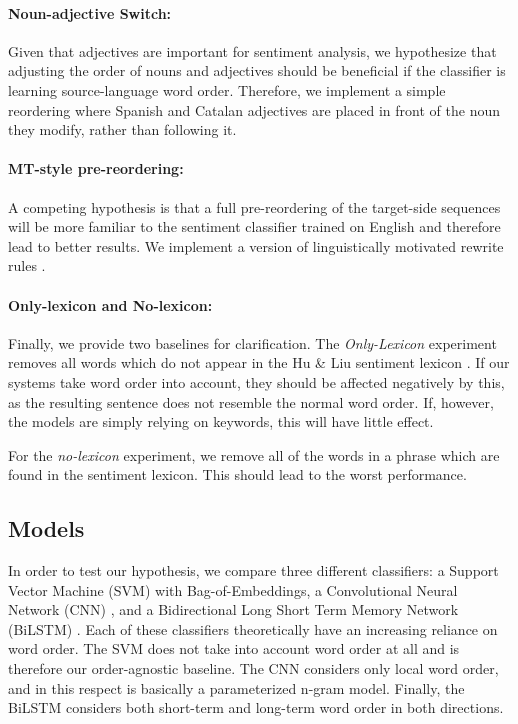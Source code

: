 \documentclass[11pt,a4paper]{article}
\newcommand{\todo}[1]{\comment{Todo}{#1}}
\begin{document}
\paragraph{Noun-adjective Switch: }Given that adjectives are important for sentiment analysis, we hypothesize that adjusting the order of nouns and adjectives should be beneficial if the classifier is learning source-language word order. Therefore, we implement a simple reordering where Spanish and Catalan adjectives are placed in front of the noun they modify, rather than following it.

\paragraph{MT-style pre-reordering: }A competing hypothesis is that a full pre-reordering of the target-side sequences will be more familiar to the sentiment classifier trained on English and therefore lead to better results. We implement a version of linguistically motivated rewrite rules \cite{Crego2006,Crego2006b}.

\paragraph{Only-lexicon and No-lexicon: }Finally, we provide two baselines for clarification. The \emph{Only-Lexicon} experiment removes all words which do
not appear in the Hu \& Liu sentiment lexicon \cite{HuandLiu2004}. If our systems
take word order into account, they should be affected negatively by this, as the
resulting sentence does not resemble the normal word order. If, however, the models
are simply relying on keywords, this will have little effect.

For the \emph{no-lexicon} experiment, we remove all of the words
in a phrase which are found in the sentiment lexicon. This should lead to the worst performance. 

\subsection{Models}

In order to test our hypothesis, we compare three different classifiers: a Support Vector Machine (SVM) \todo{CITE} with Bag-of-Embeddings, a Convolutional Neural Network (CNN) \todo{CITE}, and a Bidirectional Long Short Term Memory Network (BiLSTM) \todo{CITE}. Each of these classifiers theoretically have an increasing reliance on word order. The SVM does not take into account word order at all and is therefore our order-agnostic baseline. The CNN considers only local word order, and in this respect is basically a parameterized n-gram model. Finally, the BiLSTM considers both short-term and long-term word order in both directions.
\end{document}

